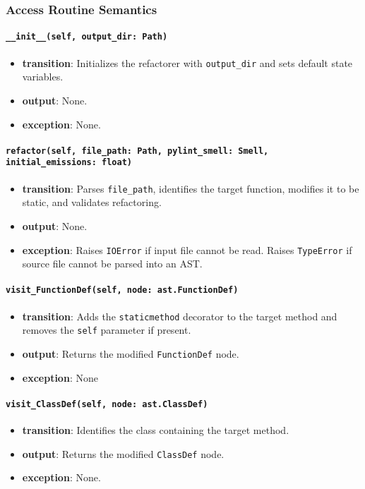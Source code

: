 \documentclass[12pt, titlepage]{article}
\begin{document}
\subsubsection{Access Routine Semantics}
  
\paragraph{\texttt{\_\_init\_\_(self, output\_dir: Path)}}
\begin{itemize}
  \item \textbf{transition}: Initializes the refactorer with \texttt{output\_dir} and sets default state variables.
  \item \textbf{output}: None.
  \item \textbf{exception}: None.
\end{itemize}
  
\paragraph{\texttt{refactor(self, file\_path: Path, pylint\_smell: Smell, initial\_emissions: float)}}
\begin{itemize}
  \item \textbf{transition}: Parses \texttt{file\_path}, identifies the target function, modifies it to be static, and validates refactoring.
  \item \textbf{output}: None.
  \item \textbf{exception}: Raises \texttt{IOError} if input file cannot be read. Raises \texttt{TypeError} if source file cannot be parsed into an AST.
\end{itemize}

\paragraph{\texttt{visit\_FunctionDef(self, node: ast.FunctionDef)}}
\begin{itemize}
  \item \textbf{transition}: Adds the \texttt{staticmethod} decorator to the target method and removes the \texttt{self} parameter if present.
  \item \textbf{output}: Returns the modified \texttt{FunctionDef} node.
  \item \textbf{exception}: None
\end{itemize}

\paragraph{\texttt{visit\_ClassDef(self, node: ast.ClassDef)}}
\begin{itemize}
  \item \textbf{transition}: Identifies the class containing the target method.
  \item \textbf{output}: Returns the modified \texttt{ClassDef} node.
  \item \textbf{exception}: None.
\end{itemize}
\end{document}
